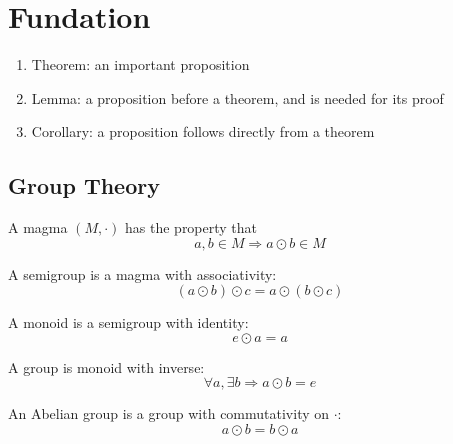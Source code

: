 \chapter{Fundation}


\begin{enumerate}
    \item Theorem: an important proposition
    \item Lemma: a proposition before a theorem, and is needed for its proof
    \item Corollary: a proposition follows directly from a theorem
\end{enumerate}


%
%

\section{Group Theory}

\begin{definition}
    A magma $(M, \cdot)$ has the property that
    \begin{equation}
        a, b \in M \Rightarrow a \odot b \in M
    \end{equation}
\end{definition}

\begin{definition}
    A semigroup is a magma with associativity:
    \begin{equation}
        (a \odot b) \odot c = a \odot (b \odot c)
    \end{equation}
\end{definition}

\begin{definition}
    A monoid is a semigroup with identity:
    \begin{equation}
        e \odot a = a
    \end{equation}
\end{definition}

\begin{definition}
    A group is monoid with inverse:
    \begin{equation}
        \forall a, \exists b \Rightarrow a \odot b = e
    \end{equation}
\end{definition}

\begin{definition}
    An Abelian group is a group with commutativity on $\cdot$:
    \begin{equation}
        a \odot b = b \odot a
    \end{equation}
\end{definition}

